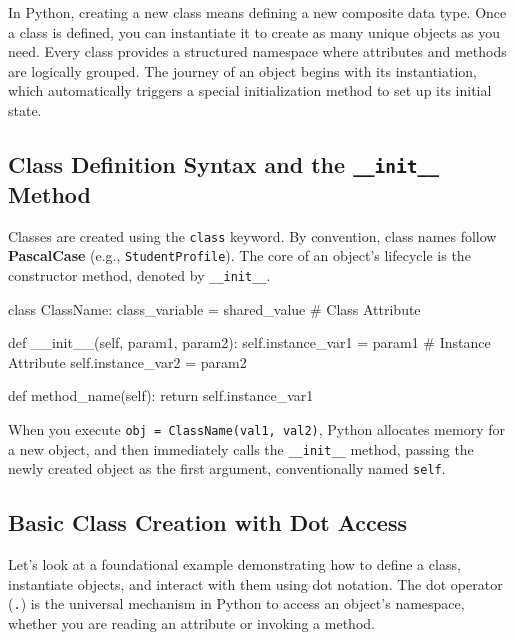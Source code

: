 In Python, creating a new class means defining a new composite data type. Once a class is defined, you can instantiate it to create as many unique objects as you need. Every class provides a structured namespace where attributes and methods are logically grouped. The journey of an object begins with its instantiation, which automatically triggers a special initialization method to set up its initial state.

\subsection{Class Definition Syntax and the \texttt{\_\_init\_\_} Method}
Classes are created using the \texttt{class} keyword. By convention, class names follow \textbf{PascalCase} (e.g., \texttt{StudentProfile}). The core of an object's lifecycle is the constructor method, denoted by \texttt{\_\_init\_\_}.

\begin{syntaxbox}
class ClassName:
    class\_variable = shared\_value \# Class Attribute
    
    def \_\_init\_\_(self, param1, param2):
        self.instance\_var1 = param1 \# Instance Attribute
        self.instance\_var2 = param2
        
    def method\_name(self):
        return self.instance\_var1
\end{syntaxbox}

When you execute \texttt{obj = ClassName(val1, val2)}, Python allocates memory for a new object, and then immediately calls the \texttt{\_\_init\_\_} method, passing the newly created object as the first argument, conventionally named \texttt{self}. 

\subsection{Basic Class Creation with Dot Access}

Let's look at a foundational example demonstrating how to define a class, instantiate objects, and interact with them using dot notation. The dot operator (\texttt{.}) is the universal mechanism in Python to access an object's namespace, whether you are reading an attribute or invoking a method.

